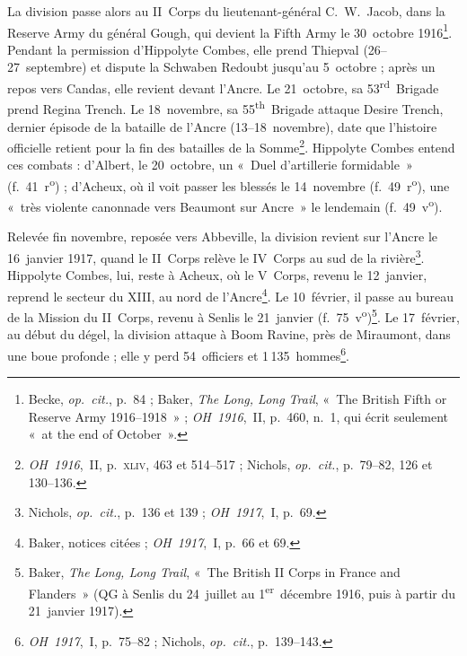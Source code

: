 La division passe alors au II~Corps du lieutenant-général C.~W.~Jacob, dans la Reserve Army du général Gough, qui devient la Fifth Army le 30~octobre 1916\footnote{Becke, \textit{op.~cit.}, p.~84 ; Baker, \textit{The Long, Long Trail}, «~The British Fifth or Reserve Army 1916--1918~» ; \textit{OH~1916},~II, p.~460, n.~1, qui écrit seulement «~at the end of October~».}. Pendant la permission d'Hippolyte Combes, elle prend Thiepval (26--27~septembre) et dispute la Schwaben Redoubt jusqu'au 5~octobre ; après un repos vers Candas, elle revient devant l'Ancre. Le 21~octobre, sa 53\textsuperscript{rd}~Brigade prend Regina Trench. Le 18~novembre, sa 55\textsuperscript{th}~Brigade attaque Desire Trench, dernier épisode de la bataille de l'Ancre (13--18~novembre), date que l'histoire officielle retient pour la fin des batailles de la Somme\footnote{\textit{OH~1916},~II, p.~\textsc{xliv}, 463 et 514--517 ; Nichols, \textit{op.~cit.}, p.~79--82, 126 et 130--136.}. Hippolyte Combes entend ces combats : d'Albert, le 20~octobre, un «~Duel d'artillerie formidable~» (f.~41~r\textsuperscript{o}) ; d'Acheux, où il voit passer les blessés le 14~novembre (f.~49~r\textsuperscript{o}), une «~très violente canonnade vers Beaumont sur Ancre~» le lendemain (f.~49~v\textsuperscript{o}).

Relevée fin novembre, reposée vers Abbeville, la division revient sur l'Ancre le 16~janvier 1917, quand le II~Corps relève le IV~Corps au sud de la rivière\footnote{Nichols, \textit{op.~cit.}, p.~136 et 139 ; \textit{OH~1917},~I, p.~69.}. Hippolyte Combes, lui, reste à Acheux, où le V~Corps, revenu le 12~janvier, reprend le secteur du XIII, au nord de l'Ancre\footnote{Baker, notices citées ; \textit{OH~1917},~I, p.~66 et 69.}. Le 10~février, il passe au bureau de la Mission du II~Corps, revenu à Senlis le 21~janvier (f.~75~v\textsuperscript{o})\footnote{Baker, \textit{The Long, Long Trail}, «~The British II Corps in France and Flanders~» (QG à Senlis du 24~juillet au 1\textsuperscript{er}~décembre 1916, puis à partir du 21~janvier 1917).}. Le 17~février, au début du dégel, la division attaque à Boom Ravine, près de Miraumont, dans une boue profonde ; elle y perd 54~officiers et 1\,135~hommes\footnote{\textit{OH~1917},~I, p.~75--82 ; Nichols, \textit{op.~cit.}, p.~139--143.}.

